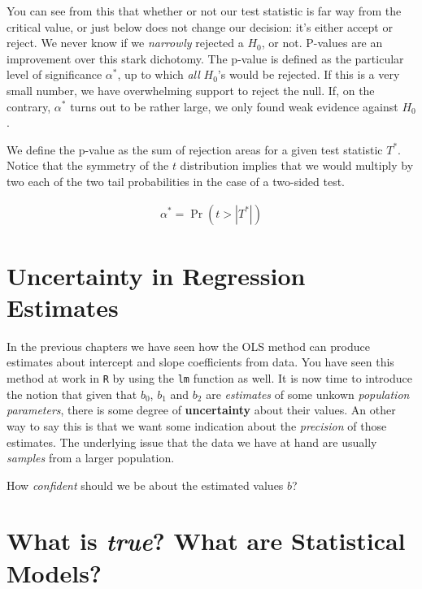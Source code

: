 \documentclass[]{book}
\newenvironment{note}{\begin{tcolorbox}[colback=blue!5!white,colframe=blue!75!black]}{\end{tcolorbox}}
\begin{document}
You can see from this that whether or not our test statistic is far way from the critical value, or just below does not change our decision: it's either accept or reject. We never know if we \emph{narrowly} rejected a \(H_0\), or not. P-values are an improvement over this stark dichotomy. The p-value is defined as the particular level of significance \(\alpha^*\), up to which \emph{all} \(H_0\)'s would be rejected. If this is a very small number, we have overwhelming support to reject the null. If, on the contrary, \(\alpha^*\) turns out to be rather large, we only found weak evidence against \(H_0\).

We define the p-value as the sum of rejection areas for a given test statistic \(T^*\). Notice that the symmetry of the \(t\) distribution implies that we would multiply by two each of the two tail probabilities in the case of a two-sided test.

\begin{align}
\alpha^* = \Pr(t > |T^*|) 
\end{align}

\hypertarget{uncertainty-in-regression-estimates}{%
\section{Uncertainty in Regression Estimates}\label{uncertainty-in-regression-estimates}}

In the previous chapters we have seen how the OLS method can produce estimates about intercept and slope coefficients from data. You have seen this method at work in \texttt{R} by using the \texttt{lm} function as well. It is now time to introduce the notion that given that \(b_0\), \(b_1\) and \(b_2\) are \emph{estimates} of some unkown \emph{population parameters}, there is some degree of \textbf{uncertainty} about their values. An other way to say this is that we want some indication about the \emph{precision} of those estimates. The underlying issue that the data we have at hand are usually \emph{samples} from a larger population.

\begin{note}
How \emph{confident} should we be about the estimated values \(b\)?
\end{note}

\hypertarget{what-is-true-what-are-statistical-models}{%
\section{\texorpdfstring{What is \emph{true}? What are Statistical Models?}{What is true? What are Statistical Models?}}\label{what-is-true-what-are-statistical-models}}
\end{document}
